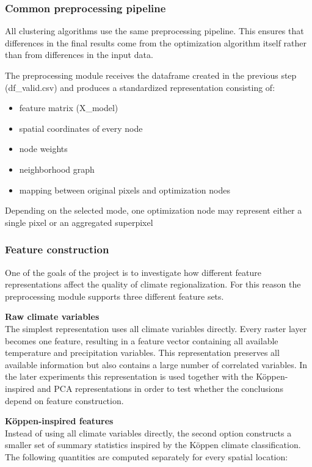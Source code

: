 \documentclass[11pt]{article}
\begin{document}
\subsubsection{Common preprocessing pipeline}

All clustering algorithms use the same preprocessing pipeline. This ensures that differences in the final results come from the optimization algorithm itself rather than from differences in the input data.

The preprocessing module receives the dataframe created in the previous step (df\_valid.csv) and produces a standardized representation consisting of:
\begin{itemize}
  \item feature matrix (X\_model)
  \item spatial coordinates of every node
  \item node weights
  \item neighborhood graph
  \item mapping between original pixels and optimization nodes
\end{itemize}

Depending on the selected mode, one optimization node may represent either a single pixel or an aggregated superpixel

\subsubsection{Feature construction}
One of the goals of the project is to investigate how different feature representations affect the quality of climate regionalization. For this reason the preprocessing module supports three different feature sets.

\textbf{Raw climate variables} \\
The simplest representation uses all climate variables directly. Every raster layer becomes one feature, resulting in a feature vector containing all available temperature and precipitation variables. This representation preserves all available information but also contains a large number of correlated variables. In the later experiments this representation is used together with the Köppen-inspired and PCA representations in order to test whether the conclusions depend on feature construction.

\textbf{Köppen-inspired features} \\
Instead of using all climate variables directly, the second option constructs a smaller set of summary statistics inspired by the Köppen climate classification. The following quantities are computed separately for every spatial location:
\end{document}
